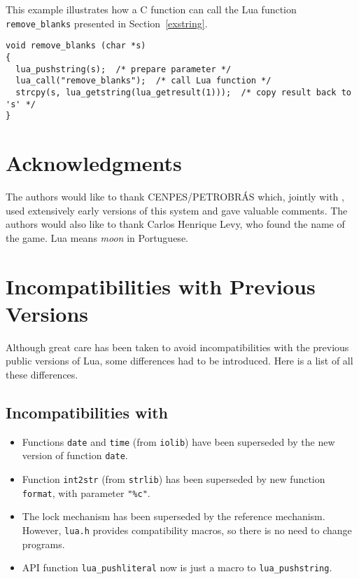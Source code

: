 This example illustrates how a C function can call the Lua function
\verb'remove_blanks' presented in Section~\ref{exstring}.
\begin{verbatim}
void remove_blanks (char *s)
{
  lua_pushstring(s);  /* prepare parameter */
  lua_call("remove_blanks");  /* call Lua function */
  strcpy(s, lua_getstring(lua_getresult(1)));  /* copy result back to 's' */
}
\end{verbatim}


\section*{Acknowledgments}

The authors would like to thank CENPES/PETROBR\'AS which,
jointly with \tecgraf, used extensively early versions of
this system and gave valuable comments.
The authors would also like to thank Carlos Henrique Levy,
who found the name of the game.
Lua means {\em moon} in Portuguese.



\appendix

\section{Incompatibilities with Previous Versions}

Although great care has been taken to avoid incompatibilities with
the previous public versions of Lua,
some differences had to be introduced.
Here is a list of all these differences.

\subsection*{Incompatibilities with }
\begin{itemize}
\item
Functions \verb'date' and \verb'time' (from \verb'iolib')
have been superseded by the new version of function \verb'date'.
\item
Function \verb'int2str' (from \verb'strlib') has been superseded by new
function \verb'format', with parameter \verb'"%c"'.
\item
The lock mechanism has been superseded by the reference mechanism.
However, \verb-lua.h- provides compatibility macros,
so there is no need to change programs.
\item
API function \verb'lua_pushliteral' now is just a macro to
\verb'lua_pushstring'.
\end{itemize}


